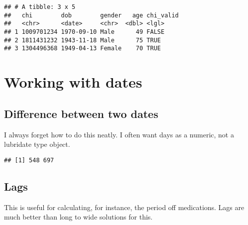 \documentclass[]{book}
\newenvironment{Shaded}{\begin{snugshade}}{\end{snugshade}}
\newcommand{\KeywordTok}[1]{\textcolor[rgb]{0.13,0.29,0.53}{\textbf{#1}}}
\newcommand{\NormalTok}[1]{#1}
\newcommand{\OperatorTok}[1]{\textcolor[rgb]{0.81,0.36,0.00}{\textbf{#1}}}
\newcommand{\StringTok}[1]{\textcolor[rgb]{0.31,0.60,0.02}{#1}}
\begin{document}
\begin{verbatim}
## # A tibble: 3 x 5
##   chi        dob        gender   age chi_valid
##   <chr>      <date>     <chr>  <dbl> <lgl>    
## 1 1009701234 1970-09-10 Male      49 FALSE    
## 2 1811431232 1943-11-18 Male      75 TRUE     
## 3 1304496368 1949-04-13 Female    70 TRUE
\end{verbatim}

\hypertarget{working-with-dates}{%
\section{Working with dates}\label{working-with-dates}}

\hypertarget{difference-between-two-dates}{%
\subsection{Difference between two dates}\label{difference-between-two-dates}}

I always forget how to do this neatly.
I often want days as a numeric, not a lubridate type object.

\begin{Shaded}
\end{Shaded}

\begin{verbatim}
## [1] 548 697
\end{verbatim}

\hypertarget{lags}{%
\subsection{Lags}\label{lags}}

This is useful for calculating, for instance, the period off medications. Lags are much better than long to wide solutions for this.
\end{document}
